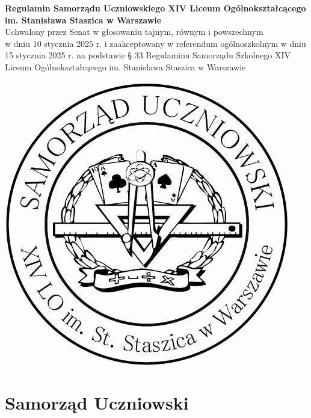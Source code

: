 \documentclass[14pt]{article}
\begin{document}
	\thispagestyle{empty}
	\vspace*{1cm}
	\begin{center}
		\Huge
		\textbf{Regulamin Samorządu Uczniowskiego XIV Liceum Ogólnokształcącego \\ im. Stanisława Staszica w Warszawie}\\
		\vspace{0.5cm}
		\large
		Uchwalony przez Senat w głosowaniu tajnym, równym i powszechnym \\w dniu 10 stycznia 2025 r. i zaakceptowany w referendum ogólnoszkolnym w dniu \\15 stycznia 2025 r. na podstawie § 33 Regulaminu Samorządu Szkolnego XIV Liceum Ogólnokształcącego im. Stanisława Staszica w Warszawie\\

	\vspace{2cm}
	
	\includegraphics[scale=0.6]{logostaszic.jpg}
		\end{center}
	
	\newpage
	\tableofcontents
\section{Samorząd Uczniowski}
\end{document}
